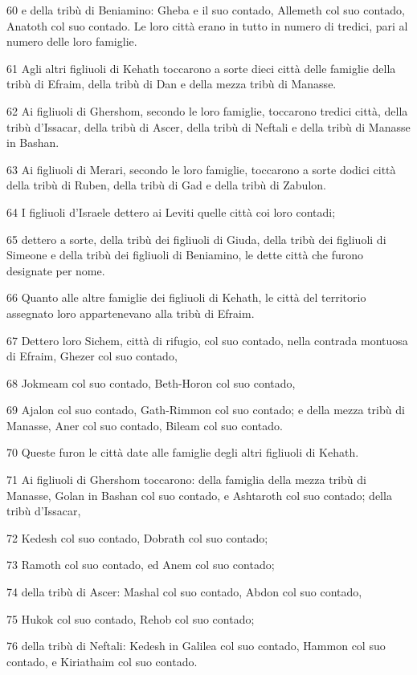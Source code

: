 \par 60 e della tribù di Beniamino: Gheba e il suo contado, Allemeth col suo contado, Anatoth col suo contado. Le loro città erano in tutto in numero di tredici, pari al numero delle loro famiglie.
\par 61 Agli altri figliuoli di Kehath toccarono a sorte dieci città delle famiglie della tribù di Efraim, della tribù di Dan e della mezza tribù di Manasse.
\par 62 Ai figliuoli di Ghershom, secondo le loro famiglie, toccarono tredici città, della tribù d'Issacar, della tribù di Ascer, della tribù di Neftali e della tribù di Manasse in Bashan.
\par 63 Ai figliuoli di Merari, secondo le loro famiglie, toccarono a sorte dodici città della tribù di Ruben, della tribù di Gad e della tribù di Zabulon.
\par 64 I figliuoli d'Israele dettero ai Leviti quelle città coi loro contadi;
\par 65 dettero a sorte, della tribù dei figliuoli di Giuda, della tribù dei figliuoli di Simeone e della tribù dei figliuoli di Beniamino, le dette città che furono designate per nome.
\par 66 Quanto alle altre famiglie dei figliuoli di Kehath, le città del territorio assegnato loro appartenevano alla tribù di Efraim.
\par 67 Dettero loro Sichem, città di rifugio, col suo contado, nella contrada montuosa di Efraim, Ghezer col suo contado,
\par 68 Jokmeam col suo contado, Beth-Horon col suo contado,
\par 69 Ajalon col suo contado, Gath-Rimmon col suo contado; e della mezza tribù di Manasse, Aner col suo contado, Bileam col suo contado.
\par 70 Queste furon le città date alle famiglie degli altri figliuoli di Kehath.
\par 71 Ai figliuoli di Ghershom toccarono: della famiglia della mezza tribù di Manasse, Golan in Bashan col suo contado, e Ashtaroth col suo contado; della tribù d'Issacar,
\par 72 Kedesh col suo contado, Dobrath col suo contado;
\par 73 Ramoth col suo contado, ed Anem col suo contado;
\par 74 della tribù di Ascer: Mashal col suo contado, Abdon col suo contado,
\par 75 Hukok col suo contado, Rehob col suo contado;
\par 76 della tribù di Neftali: Kedesh in Galilea col suo contado, Hammon col suo contado, e Kiriathaim col suo contado.
